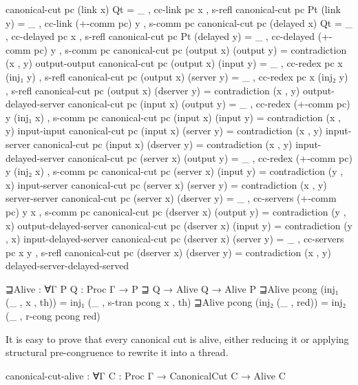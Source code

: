\begin{code}[hide]
canonical-cut pc (link x) Qt = _ , cc-link pc x , s-refl
canonical-cut pc Pt (link y) = _ , cc-link (+-comm pc) y , s-comm pc
canonical-cut pc (delayed x) Qt = _ , cc-delayed pc x , s-refl
canonical-cut pc Pt (delayed y) = _ , cc-delayed (+-comm pc) y , s-comm pc
canonical-cut pc (output x) (output y) = contradiction (x , y) output-output
canonical-cut pc (output x) (input y) = _ , cc-redex pc x (inj₁ y) , s-refl
canonical-cut pc (output x) (server y) = _ , cc-redex pc x (inj₂ y) , s-refl
canonical-cut pc (output x) (dserver y) = contradiction (x , y) output-delayed-server
canonical-cut pc (input x) (output y) = _ , cc-redex (+-comm pc) y (inj₁ x) , s-comm pc
canonical-cut pc (input x) (input y) = contradiction (x , y) input-input
canonical-cut pc (input x) (server y) = contradiction (x , y) input-server
canonical-cut pc (input x) (dserver y) = contradiction (x , y) input-delayed-server
canonical-cut pc (server x) (output y) = _ , cc-redex (+-comm pc) y (inj₂ x) , s-comm pc
canonical-cut pc (server x) (input y) = contradiction (y , x) input-server
canonical-cut pc (server x) (server y) = contradiction (x , y) server-server
canonical-cut pc (server x) (dserver y) = _ , cc-servers (+-comm pc) y x , s-comm pc
canonical-cut pc (dserver x) (output y) = contradiction (y , x) output-delayed-server
canonical-cut pc (dserver x) (input y) = contradiction (y , x) input-delayed-server
canonical-cut pc (dserver x) (server y) = _ , cc-servers pc x y , s-refl
canonical-cut pc (dserver x) (dserver y) = contradiction (x , y) delayed-server-delayed-served

⊒Alive : ∀{Γ} {P Q : Proc Γ} → P ⊒ Q → Alive Q → Alive P
⊒Alive pcong (inj₁ (_ , x , th)) = inj₁ (_ , s-tran pcong x , th)
⊒Alive pcong (inj₂ (_ , red)) = inj₂ (_ , r-cong pcong red)
\end{code}

It is easy to prove that every canonical cut is alive, either reducing it or
applying structural pre-congruence to rewrite it into a thread.

\begin{code}
canonical-cut-alive : ∀{Γ} {C : Proc Γ} → CanonicalCut C → Alive C
\end{code}

